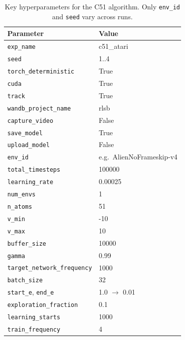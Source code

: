 \begin{table}
	\caption{Key hyperparameters for the C51 algorithm. Only \texttt{env\_id} and \texttt{seed} vary across runs.}
	\label{tab:c51_hyperparams}
	\centering
	\begin{tabular}{ll}
		\toprule
		\textbf{Parameter} & \textbf{Value} \\
		\midrule
		\texttt{exp\_name}                & c51\_atari \\
		\texttt{seed}                     & 1..4 \\
		\texttt{torch\_deterministic}     & True \\
		\texttt{cuda}                     & True \\
		\texttt{track}                    & True \\
		\texttt{wandb\_project\_name}     & rlsb \\
		\texttt{capture\_video}           & False \\
		\texttt{save\_model}              & True \\
		\texttt{upload\_model}            & False \\
		\texttt{env\_id}                  & e.g.\ AlienNoFrameskip-v4 \\
		\texttt{total\_timesteps}         & 100000 \\
		\texttt{learning\_rate}           & 0.00025 \\
		\texttt{num\_envs}                & 1 \\
		\texttt{n\_atoms}                 & 51 \\
		\texttt{v\_min}                   & -10 \\
		\texttt{v\_max}                   & 10 \\
		\texttt{buffer\_size}             & 10000 \\
		\texttt{gamma}                    & 0.99 \\
		\texttt{target\_network\_frequency} & 1000 \\
		\texttt{batch\_size}             & 32 \\
		\texttt{start\_e}, \texttt{end\_e} & 1.0 $\to$ 0.01 \\
		\texttt{exploration\_fraction}    & 0.1 \\
		\texttt{learning\_starts}         & 1000 \\
		\texttt{train\_frequency}         & 4 \\
		\bottomrule
	\end{tabular}
\end{table}

